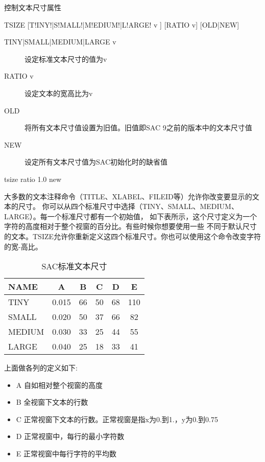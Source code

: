 \label{cmd:tsize}

控制文本尺寸属性

\begin{SACSTX}
TSIZE [T!INY!|S!MALL!|M!EDIUM!|L!ARGE! v ] [RATIO v] [OLD|NEW]
\end{SACSTX}

\begin{description}
\item [TINY|SMALL|MEDIUM|LARGE v] 设定标准文本尺寸的值为v 
\item [RATIO v] 设定文本的宽高比为v 
\item [OLD] 将所有文本尺寸值设置为旧值。旧值即SAC 9之前的版本中的文本尺寸值
\item [NEW] 设定所有文本尺寸值为SAC初始化时的缺省值
\end{description}

\begin{SACDFT}
tsize ratio 1.0 new
\end{SACDFT}

大多数的文本注释命令（TITLE、XLABEL、FILEID等）允许你改变要显示的文本的尺寸。
你可以从四个标准尺寸中选择（TINY、SMALL、MEDIUM、LARGE）。每一个标准尺寸都有一个初始值，
如下表所示，这个尺寸定义为一个字符的高度相对于整个视窗的百分比。有些时候你想要使用一些
不同于默认尺寸的文本。TSIZE允许你重新定义这四个标准尺寸。你也可以使用这个命令改变字符的宽-高比。
\begin{table}[!ht]
\centering
\caption{SAC标准文本尺寸}
\begin{tabular}{lccccc}
\toprule
NAME	&	A	&	B	&	C	&	D	&	E	\\
\midrule
TINY 	& 0.015 &   66 	&  50  	&	68  &	110	\\
SMALL	& 0.020 &	50  &  37  	&	66  &	82	\\
MEDIUM  & 0.030 &	33  &  25  	&	44  &	55	\\
LARGE	& 0.040 &	25  &  18  	&	33  &	41	\\
\bottomrule
\end{tabular}
\end{table}

上面做各列的定义如下:
\begin{itemize}
\item A 自如相对整个视窗的高度
\item B 全视窗下文本的行数
\item C 正常视窗下文本的行数。正常视窗是指x为0.到1.，y为0.到0.75
\item D 正常视窗中，每行的最小字符数
\item E 正常视窗中每行字符的平均数
\end{itemize}

